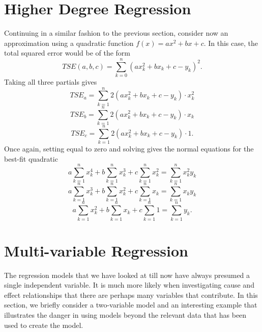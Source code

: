 \documentclass[10pt,]{book}
\theoremstyle{plain}
\theoremstyle{definition}
\theoremstyle{definition}
\theoremstyle{definition}
\numberwithin{equation}{section}
\begin{document}
%
\typeout{************************************************}
\typeout{************************************************}
\section[{Higher Degree Regression}]{Higher Degree Regression}\label{section-13}

Continuing in a similar fashion to the previous section, consider now an approximation using a quadratic function \(f(x) = ax^2 + bx + c\).  In this case, the total squared error would be of the form
\begin{equation*}TSE(a,b,c) = \sum_{k=0}^n (a x_k^2 + b x_k + c - y_k)^2.\end{equation*}
Taking all three partials gives
\begin{equation*}TSE_a = \sum_{k=1}^n 2(a x_k^2 + b x_k + c - y_k) \cdot x_k^2\end{equation*}
\begin{equation*}TSE_b = \sum_{k=1}^n 2(a x_k^2 + b x_k + c - y_k) \cdot x_k\end{equation*}
\begin{equation*}TSE_c = \sum_{k=1}^n 2(a x_k^2 + b x_k + c - y_k) \cdot 1 .\end{equation*}
Once again, setting equal to zero and solving gives the normal equations for the best-fit quadratic
\begin{equation*}a \sum_{k=1}^n x_k^4 + b \sum_{k=1}^n x_k^3 + c \sum_{k=1}^n x_k^2 = \sum_{k=1}^n x_k^2 y_k\end{equation*}
\begin{equation*}a \sum_{k=1}^n x_k^3 + b \sum_{k=1}^n x_k^2 + c \sum_{k=1}^n x_k = \sum_{k=1}^n x_k y_k\end{equation*}
\begin{equation*}a \sum_{k=1}^n x_k^2 + b \sum_{k=1}^n x_k + c \sum_{k=1}^n 1 = \sum_{k=1}^n y_k.\end{equation*}


%
\typeout{************************************************}
\typeout{************************************************}
\section[{Multi-variable Regression}]{Multi-variable Regression}\label{section-14}

The regression models that we have looked at till now have always presumed a single independent variable. It is much more likely when investigating cause and effect relationships that there are perhaps many variables that contribute.  In this section, we briefly consider a two-variable model and an interesting example that illustrates the danger in using models beyond the relevant data that has been used to create the model.
%
\par
\end{document}
